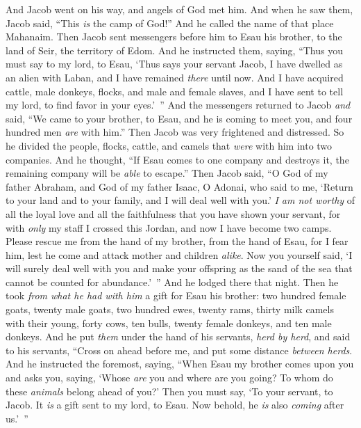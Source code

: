 \begin{biblechapter} %
 And Jacob went on his way, and angels of God met him.
\verse And when he saw them, Jacob said, “This \textit{is} the camp of God!” And he called the name of that place Mahanaim.
\verse Then Jacob sent messengers before him to Esau his brother, to the land of Seir, the territory of Edom.
\verse And he instructed them, saying, “Thus you must say to my lord, to Esau, ‘Thus says your servant Jacob, I have dwelled as an alien with Laban, and I have remained \textit{there} until now.
\verse And I have acquired cattle, male donkeys, flocks, and male and female slaves, and I have sent to tell my lord, to find favor in your eyes.’ ”
\verse And the messengers returned to Jacob \textit{and} said, “We came to your brother, to Esau, and he is coming to meet you, and four hundred men \textit{are} with him.”
\verse Then Jacob was very frightened and distressed. So he divided the people, flocks, cattle, and camels that \textit{were} with him into two companies.
\verse And he thought, “If Esau comes to one company and destroys it, the remaining company will be \textit{able} to escape.”
\verse Then Jacob said, “O God of my father Abraham, and God of my father Isaac, O Adonai, who said to me, ‘Return to your land and to your family, and I will deal well with you.’
\verse \textit{I am not worthy} of all the loyal love and all the faithfulness that you have shown your servant, for with \textit{only} my staff I crossed this Jordan, and now I have become two camps.
\verse Please rescue me from the hand of my brother, from the hand of Esau, for I fear him, lest he come and attack mother and children \textit{alike}.
\verse Now you yourself said, ‘I will surely deal well with you and make your offspring as the sand of the sea that cannot be counted for abundance.’ ”
\verse And he lodged there that night. Then he took \textit{from what he had with him} a gift for Esau his brother:
\verse two hundred female goats, twenty male goats, two hundred ewes, twenty rams,
\verse thirty milk camels with their young, forty cows, ten bulls, twenty female donkeys, and ten male donkeys.
\verse And he put \textit{them} under the hand of his servants, \textit{herd by herd}, and said to his servants, “Cross on ahead before me, and put some distance \textit{between herds}.
\verse And he instructed the foremost, saying, “When Esau my brother comes upon you and asks you, saying, ‘Whose \textit{are} you and where are you going? To whom do these \textit{animals} belong ahead of you?’
\verse Then you must say, ‘To your servant, to Jacob. It \textit{is} a gift sent to my lord, to Esau. Now behold, he \textit{is} also \textit{coming} after us.’ ”

\end{biblechapter}
